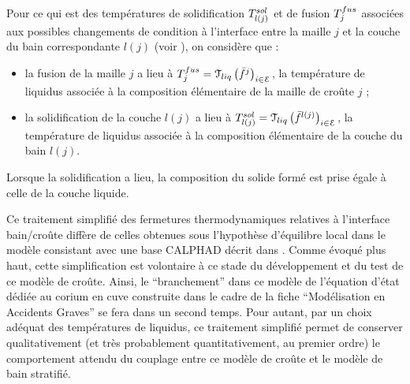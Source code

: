 Pour ce qui est des températures de solidification $\temperature[sol]{l(j)}$ et de fusion $\temperature[fus]{j}$ associées aux possibles changements de condition à l'interface entre la maille $j$ et la couche du bain correspondante $l(j)$ (voir ), on considère que :
\begin{itemize}
 \item la fusion de la maille $j$ a lieu à $\temperature[fus]{j}=\Mc{T}_{liq}\left(\elementMassFraction[j]{}\right)_{i\in\elementSet}$, la température de liquidus associée à la composition élémentaire de la maille de croûte $j$ ;
 \item la solidification de la couche $l(j)$ a lieu à $\temperature[sol]{l(j)}=\Mc{T}_{liq}\left(\elementMassFraction[l(j)]{}\right)_{i\in\elementSet}$, la température de liquidus associée à la composition élémentaire de la couche du bain $l(j)$.
\end{itemize}
Lorsque la solidification a lieu, la composition du solide formé est prise égale à celle de la couche liquide. 

Ce traitement simplifié des fermetures thermodynamiques relatives à l'interface bain/croûte diffère de celles obtenues sous l'hypothèse d'équilibre local dans le modèle consistant avec une base CALPHAD décrit dans \cite{Tiwari2018}. Comme évoqué plus haut, cette simplification est volontaire à ce stade du développement et du test de ce modèle de croûte. Ainsi, le ``branchement'' dans ce modèle de l'équation d'état dédiée au corium en cuve construite dans le cadre de la fiche ``Modélisation en Accidents Graves'' se fera dans un second temps. Pour autant, par un choix adéquat des températures de liquidus, ce traitement simplifié permet de conserver qualitativement (et très probablement quantitativement, au premier ordre) le comportement attendu du couplage entre ce modèle de croûte et le modèle de bain stratifié.

